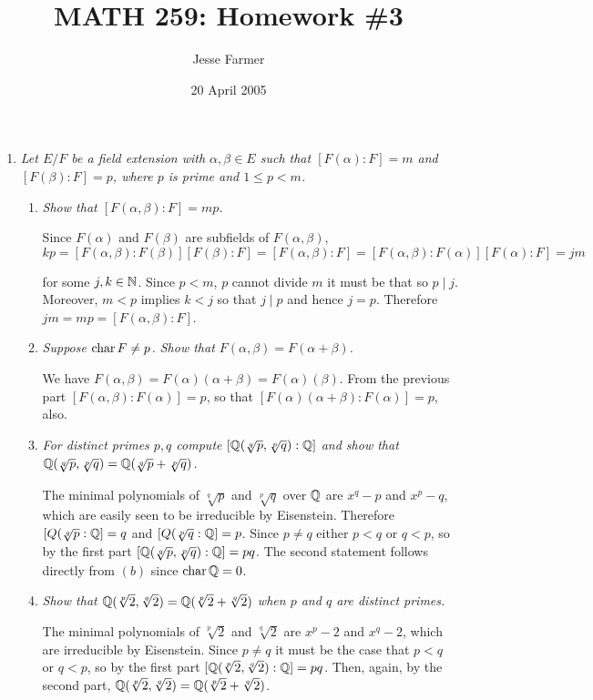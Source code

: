 \documentclass[10pt]{article}
\title{MATH 259: Homework \#3}
\author{Jesse Farmer}
\date{20 April 2005}
\begin{document}
\maketitle
\begin{enumerate}

\item \emph{Let $E/F$ be a field extension with $\alpha, \beta \in E$ such that $[F(\alpha):F] = m$ and $[F(\beta):F] = p$, where $p$ is prime and $1 \leq p < m$.}
\begin{enumerate}
\item \emph{Show that $[F(\alpha, \beta):F] = mp$.}

Since $F(\alpha)$ and $F(\beta)$ are subfields of $F(\alpha, \beta)$,
\[
kp = [F(\alpha, \beta):F(\beta)][F(\beta):F] = [F(\alpha, \beta):F] = [F(\alpha, \beta):F(\alpha)][F(\alpha):F] = jm
\]

for some $j,k \in \mathbb{N}$.  Since $p < m$, $p$ cannot divide $m$ it must be that so $p \mid j$.  Moreover, $m < p$ implies $k < j$ so that $j \mid p$ and hence $j = p$.  Therefore $jm = mp = [F(\alpha, \beta):F]$.

\item \emph{Suppose $\operatorname{char} F \neq p$.  Show that $F(\alpha, \beta) = F(\alpha + \beta)$.}

We have $F(\alpha, \beta) = F(\alpha)(\alpha+\beta) = F(\alpha)(\beta)$.  From the previous part $[F(\alpha, \beta):F(\alpha)] = p$, so that $[F(\alpha)(\alpha+\beta):F(\alpha)] = p$, also.

\item \emph{For distinct primes $p,q$ compute $[\mathbb{Q}(\sqrt[q]{p}, \sqrt[p]{q}):\mathbb{Q}]$ and show that $\mathbb{Q}(\sqrt[q]{p}, \sqrt[p]{q}) = \mathbb{Q}(\sqrt[q]{p}+\sqrt[p]{q})$.}

The minimal polynomials of $\sqrt[q]{p}$ and $\sqrt[p]{q}$ over $\mathbb{Q}$ are $x^q - p$ and $x^p -q$, which are easily seen to be irreducible by Eisenstein.  Therefore $[Q(\sqrt[q]{p}:\mathbb{Q}] = q$ and $[Q(\sqrt[p]{q}:\mathbb{Q}] = p$.  Since $p \neq q$ either $p < q$ or $q < p$, so by the first part $[\mathbb{Q}(\sqrt[q]{p}, \sqrt[p]{q}): \mathbb{Q}] = pq$.  The second statement follows directly from $(b)$ since $\operatorname{char} \mathbb{Q} = 0$.

\item \emph{Show that $\mathbb{Q}(\sqrt[p]{2}, \sqrt[q]{2}) = \mathbb{Q}(\sqrt[p]{2} + \sqrt[q]{2})$ when $p$ and $q$ are distinct primes.}

The minimal polynomials of $\sqrt[p]{2}$ and $\sqrt[q]{2}$ are $x^p-2$ and $x^q - 2$, which are irreducible by Eisenstein.  Since $p \neq q$ it must be the case that $p < q$ or $q < p$, so by the first part $[\mathbb{Q}(\sqrt[p]{2}, \sqrt[q]{2}):\mathbb{Q}] = pq$.  Then, again, by the second part, $\mathbb{Q}(\sqrt[p]{2}, \sqrt[q]{2}) = \mathbb{Q}(\sqrt[p]{2} + \sqrt[q]{2})$.


\end{enumerate}
\end{enumerate}
\end{document}
